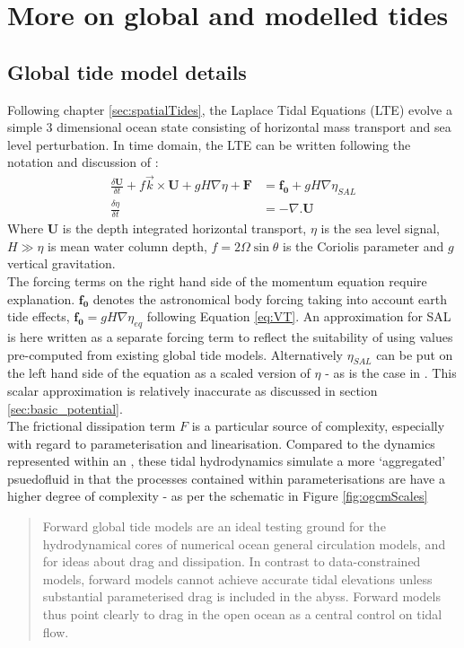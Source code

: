 \chapter{More on global and modelled tides}
\label{appendix:globalTides}
\section{Global tide model details}
Following chapter \ref{sec:spatialTides}, the Laplace Tidal Equations (LTE) evolve a simple 3 dimensional ocean state consisting of horizontal mass transport and sea level perturbation. In time domain, the LTE can be written following the notation and discussion of \cite[pp185]{Egbert:2002ug}:
\begin{align}
    \label{eq:LTE_momtm}
    \frac{\delta \mathbf{U} }{ \delta t} + f\vec{k} \times \mathbf{U} + gH\nabla \eta  + \mathbf{F} &= \mathbf{f_0} + gH \nabla \eta_{SAL} \\
    \label{eq:LTE_cont}
    \frac{\delta \eta }{\delta t} &= -\nabla.\mathbf{U} 
\end{align}
Where $\mathbf{U}$ is the depth integrated horizontal transport, $\eta$ is the sea level signal, $H \gg \eta$ is mean water column depth, $f=2\Omega\sin\theta$ is the Coriolis parameter and $g$ vertical gravitation.\\
The forcing terms on the right hand side of the momentum equation \label{E:LTE_momtm} require explanation.  
$\mathbf{f_0}$ denotes the astronomical body forcing taking into account earth tide effects, $\mathbf{f_0} = gH\nabla\eta_{eq}$ following Equation \ref{eq:VT}.  
An approximation for SAL is here written as a separate forcing term to reflect the suitability of using values pre-computed from existing global tide models.   
Alternatively $\eta_{SAL}$ can be put on the left hand side of the equation as a scaled version of $\eta$ - as is the case in \MOM{}.   
This scalar approximation is relatively inaccurate as discussed in section \ref{sec:basic_potential}.\\
The frictional dissipation term $F$ is a particular source of complexity, especially with regard to parameterisation and linearisation.
Compared to the dynamics represented within an \OGCM{}, these tidal hydrodynamics simulate a more `aggregated' psuedofluid in that the processes contained within parameterisations are have a higher degree of complexity - as per the schematic in Figure \ref{fig:ogcmScales}
\begin{quotation}
Forward global tide models are an ideal testing ground for the hydrodynamical cores of numerical ocean general circulation models, and for ideas about drag and dissipation. In contrast to data-constrained models, forward models cannot achieve accurate tidal elevations unless substantial parameterised drag is included in the abyss. Forward models thus point clearly to drag in the open ocean as a central control on tidal flow.\citep{Arbic:2004wz}
\end{quotation} 
